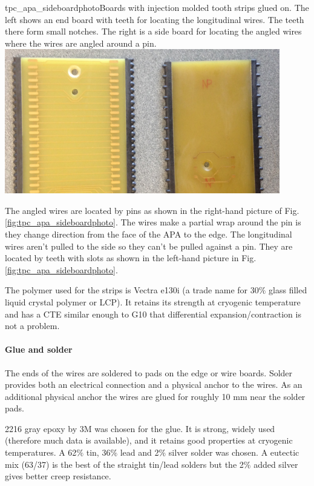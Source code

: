 \begin{cdrfigure}{tpc_apa_sideboardphoto}{Boards with injection molded tooth strips glued on.  The left shows an end board with teeth for locating the longitudinal wires.  The teeth there form small notches. The right is a side board for locating the angled wires where the wires are angled around a pin.}
\includegraphics[width=0.9\textwidth]{figures/tpc_apa_sideboardphoto.png} 
\end{cdrfigure}

The angled wires are located by pins as shown in the right-hand picture of Fig. \ref{fig:tpc_apa_sideboardphoto}.  The wires make a partial wrap around the pin is they change direction from the face of the APA to the edge.  The longitudinal wires aren't pulled to the side so they can't be pulled against a pin.  They are located by teeth with slots as shown in the left-hand picture in Fig. \ref{fig:tpc_apa_sideboardphoto}. 
	
The polymer used for the strips is Vectra e130i (a trade name for 30$\%$ glass filled liquid crystal polymer or LCP). It retains its strength at cryogenic temperature and has a CTE similar enough to G10 that differential expansion/contraction is not a problem.

\paragraph{Glue and solder}
The ends of the wires are soldered to pads on the edge or wire boards.  Solder provides both an electrical connection and a physical anchor to the wires.  As an additional physical anchor the wires are glued for roughly 10 mm near the solder pads.

2216 gray epoxy by 3M was chosen for the glue.  It is strong, widely used (therefore much data is available), and it retains good properties at cryogenic temperatures.  A 62$\%$ tin, 36$\%$ lead and 2$\%$ silver solder was chosen.  A eutectic mix (63/37) is the best of the straight tin/lead solders but the 2$\%$ added silver gives better creep resistance.

